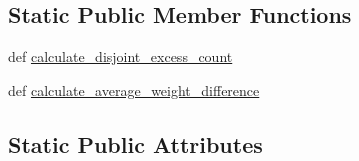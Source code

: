 \subsection*{Static Public Member Functions}
\begin{DoxyCompactItemize}
\item 
def \hyperlink{classNEAT__PyGenetics_1_1NEAT_1_1Analyst_1_1GenomeClusterer_1_1GenomeClusterer_a25f21d57d135bbf3b0f23bbfdef375e7}{calculate\+\_\+disjoint\+\_\+excess\+\_\+count}
\item 
def \hyperlink{classNEAT__PyGenetics_1_1NEAT_1_1Analyst_1_1GenomeClusterer_1_1GenomeClusterer_a748db217e8ce0c9f3e4302b00b4677e8}{calculate\+\_\+average\+\_\+weight\+\_\+difference}
\end{DoxyCompactItemize}
\subsection*{Static Public Attributes}
